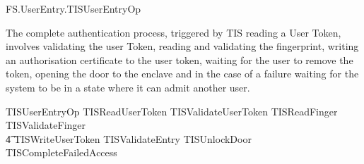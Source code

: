 \begin{traceunit}{FS.UserEntry.TISUserEntryOp}
\end{traceunit}

The complete authentication process, triggered by TIS reading a User
Token, involves validating the user Token, reading and validating the
fingerprint, 
writing an authorisation certificate to the user token, waiting for
the user to remove the token, opening the door to the enclave and
in the case of a failure waiting for the system to
be in a state where it can admit another user.

\begin{zed}
        TISUserEntryOp  TISReadUserToken \lor TISValidateUserToken \lor TISReadFinger \lor
                TISValidateFinger 
\\ \t4          \lor TISWriteUserToken \lor  TISValidateEntry \lor TISUnlockDoor \lor
                TISCompleteFailedAccess 
\end{zed}


